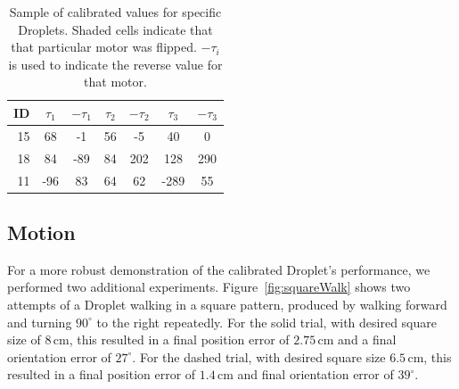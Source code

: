 \documentclass[letterpaper, 10pt, conference]{ieeeconf}
\begin{document}
\begin{table}[!htb]
\centering
\begin{tabular}{r|c|c|c|c|c|c}
 ID & $\tau_1$ & $-\tau_1$ & $\tau_2$ & $-\tau_2$ & $\tau_3$ & $-\tau_3$ \\
\hline
15 & 68 & -1 & 56 & -5 & \cellcolor{gray!15} 40 & \cellcolor{gray!15} 0\\ 
18 & 84 & -89 & 84 & 202 & \cellcolor{gray!15} 128 & \cellcolor{gray!15} 290\\
11 & -96 & 83 & 64 & 62 & -289 & 55 \\
\end{tabular}
\caption{Sample of calibrated values for specific Droplets. Shaded cells indicate that that particular motor was flipped. $-\tau_i$ is used to indicate the reverse value for that motor.}
\label{DropletValueTable}
\end{table}

\subsection{Motion}
For a more robust demonstration of the calibrated Droplet's performance, we performed two additional experiments. Figure~\ref{fig:squareWalk} shows two attempts of a Droplet walking in a square pattern, produced by walking forward and turning $90^\circ$ to the right repeatedly. For the solid trial, with desired square size of $8\,\mathrm{cm}$, this resulted in a final position error of $2.75\,\mathrm{cm}$ and a final orientation error of $27^\circ$. For the dashed trial, with desired square size $6.5\,\mathrm{cm}$, this resulted in a final position error of $1.4\,\mathrm{cm}$ and final orientation error of $39^\circ$.
\end{document}

